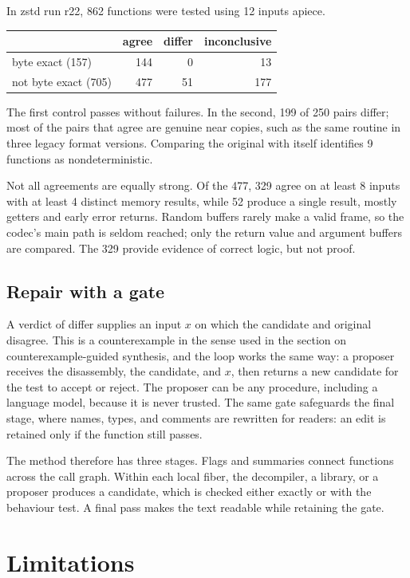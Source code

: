 \documentclass[11pt]{article}
\theoremstyle{definition}
\theoremstyle{remark}
\begin{document}
In zstd run r22, 862 functions were tested using 12 inputs apiece.

\begin{center}
\begin{tabular}{lrrr}
 & agree & differ & inconclusive \\
\hline
byte exact (157) & 144 & 0 & 13 \\
not byte exact (705) & 477 & 51 & 177 \\
\end{tabular}
\end{center}

The first control passes without failures. In the second, 199 of 250 pairs differ; most of the pairs that agree are genuine near copies, such as the same routine in three legacy format versions. Comparing the original with itself identifies 9 functions as nondeterministic.

Not all agreements are equally strong. Of the 477, 329 agree on at least 8 inputs with at least 4 distinct memory results, while 52 produce a single result, mostly getters and early error returns. Random buffers rarely make a valid frame, so the codec's main path is seldom reached; only the return value and argument buffers are compared. The 329 provide evidence of correct logic, but not proof.

\subsection{Repair with a gate}

A verdict of differ supplies an input $x$ on which the candidate and original disagree. This is a counterexample in the sense used in the section on counterexample-guided synthesis, and the loop works the same way: a proposer receives the disassembly, the candidate, and $x$, then returns a new candidate for the test to accept or reject. The proposer can be any procedure, including a language model, because it is never trusted. The same gate safeguards the final stage, where names, types, and comments are rewritten for readers: an edit is retained only if the function still passes.

The method therefore has three stages. Flags and summaries connect functions across the call graph. Within each local fiber, the decompiler, a library, or a proposer produces a candidate, which is checked either exactly or with the behaviour test. A final pass makes the text readable while retaining the gate.

\section{Limitations}
\end{document}
